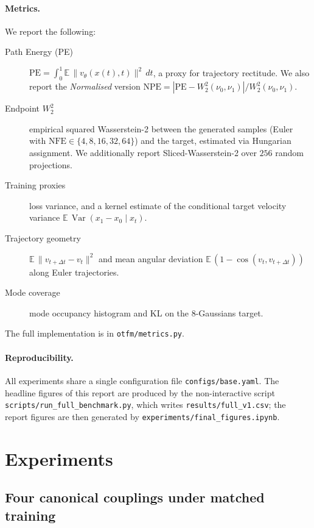 \documentclass[11pt,a4paper]{article}
\newcommand{\E}{\mathbb{E}}
\DeclareMathOperator{\Var}{Var}
\begin{document}
\paragraph{Metrics.}
We report the following:
\begin{description}
    \item[Path Energy (PE)] $\mathrm{PE} = \int_0^1 \E\,\|v_\theta(x(t), t)\|^2\, dt$,
          a proxy for trajectory rectitude.  We also report the
          \emph{Normalised} version $\mathrm{NPE} = |\mathrm{PE} - W_2^2(\nu_0,
          \nu_1)| / W_2^2(\nu_0, \nu_1)$.
    \item[Endpoint $W_2^2$] empirical squared Wasserstein-2 between the
          generated samples (Euler with $\mathrm{NFE} \in \{4, 8, 16, 32, 64\}$)
          and the target, estimated via Hungarian assignment.  We additionally
          report Sliced-Wasserstein-2 over $256$ random projections.
    \item[Training proxies] loss variance, and a kernel estimate of the
          conditional target velocity variance $\E\,\Var(x_1 - x_0 \mid x_t)$.
    \item[Trajectory geometry] $\E\,\|v_{t+\Delta t} - v_t\|^2$ and
          mean angular deviation $\E\,(1 - \cos(v_t, v_{t+\Delta t}))$ along
          Euler trajectories.
    \item[Mode coverage] mode occupancy histogram and KL on the
          8-Gaussians target.
\end{description}
The full implementation is in \texttt{otfm/metrics.py}.

\paragraph{Reproducibility.}  All experiments share a single configuration file
\texttt{configs/base.yaml}.  The headline figures of this report are produced by
the non-interactive script \texttt{scripts/run\_full\_benchmark.py}, which writes
\texttt{results/full\_v1.csv}; the report figures are then generated by
\texttt{experiments/final\_figures.ipynb}.

\section{Experiments}
\label{sec:experiments}

\subsection{Four canonical couplings under matched training}
\end{document}
